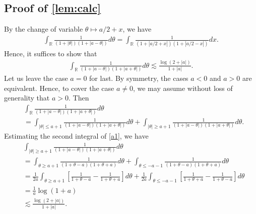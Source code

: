 \documentclass[12pt,reqno]{amsart}
\numberwithin{equation}{section}  %
\numberwithin{figure}{section}
\newcommand{\rr}{\mathbb{R}}
\theoremstyle{plain}
\theoremstyle{definition}
\theoremstyle{remark}
\begin{document}
\subsection{Proof of \autoref{lem:calc}}
%
%
%
By the change of variable $\theta \mapsto a/2 + x$, we have
%
%
\begin{equation*}
	\begin{split}
		\int_{\rr} \frac{1}{(1 + | \theta |)(1 + | a - \theta |)}d \theta
	= \int_{\rr} \frac{1}{(1 + |  a/2 + x |)(1 + | a/2 - x |)}d x.
	\end{split}
\end{equation*}
%
%
Hence, it suffices to show that
%
%
\begin{equation*}
	\begin{split}
		\int_{\rr} \frac{1}{(1 + | a - \theta |)(1 + | a + \theta |)}d \theta
		\lesssim \frac{\log(2 + | a |)}{1 + | a |}.
	\end{split}
\end{equation*}
%
%
Let us leave the case $a = 0$ for last. By symmetry, the cases $a<0$ and $a >0$
are equivalent. Hence, to cover the case $a \neq0$, we may assume
without loss of generality that $a >0$.
%
%
Then
\begin{equation}
	\label{a1}
	\begin{split}
		& \int_{\rr} \frac{1}{(1 + | a - \theta |)(1 + | a + \theta |)}d \theta
		\\
		& = \int_{| \theta| \le a+1 } \frac{1}{(1 + | a - \theta |)(1 + | a + \theta
		|)}d \theta + \int_{| \theta| \ge a+1 } \frac{1}{(1 + | a - \theta |)(1 + |
		a + \theta |)}d \theta.
	\end{split}
\end{equation}
Estimating the second integral of \eqref{a1}, we have
\begin{equation*}
	\begin{split}
		& \int_{| \theta| \ge a+1 } \frac{1}{(1 + | a - \theta |)(1 + | a + \theta
		|)}d \theta 
		\\
		& = \int_{\theta \ge a + 1} \frac{1}{(1 + \theta-a)(1 + \theta+a)} d \theta
		+ \int_{\theta \le -a -1} \frac{1}{(1 + \theta - a) (1 + \theta + a)}d \theta
		\\
		& = \frac{1}{2a} \int_{\theta \ge a + 1} \left[ \frac{1}{1 + \theta -a} -
		\frac{1}{1 + \theta+a} \right] d \theta
		+ \frac{1}{2a} \int_{\theta \le -a-1} \left[ \frac{1}{1 + \theta+a}
		-\frac{1}{1 + \theta -a} \right] d \theta
		\\
		& = \frac{1}{a} \log(1+a)
		\\
		& \lesssim \frac{\log(2 + |a|)}{1 + | a |}.
	\end{split}
\end{equation*}
\end{document}
